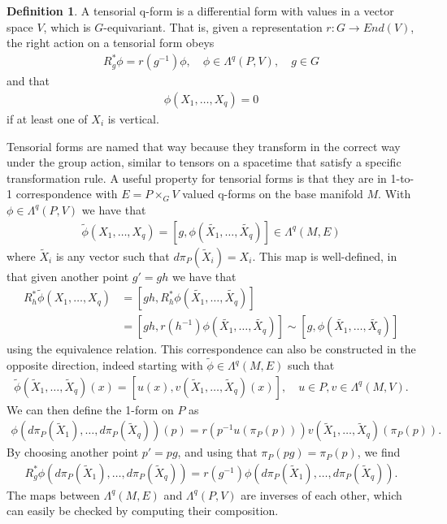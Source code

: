\documentclass[10pt]{report}
\theoremstyle{definition}
\newtheorem{definition}{Definition}[chapter]
\begin{document}
\begin{definition}
    A tensorial q-form is a differential form with values in a vector space $V$, which is $G$-equivariant. That is, given a representation $r : G \rightarrow End(V)$, the right action on a tensorial form obeys
    \begin{align}
        R_g^* \phi = r\left(g^{-1}\right) \phi,\quad \phi \in \Lambda^q(P,V), \quad g \in G
    \end{align}
    and that 
    \begin{align}
        \phi(X_1,\ldots,X_q) = 0
    \end{align}
    if at least one of $X_i$ is vertical.
\end{definition}
Tensorial forms are named that way because they transform in the correct way under the group action, similar to tensors on a spacetime that satisfy a specific transformation rule. A useful property for tensorial forms is that they are in 1-to-1 correspondence with $E = P \times_G V$ valued q-forms on the base manifold $M$. With $\phi \in \Lambda^q(P,V)$ we have that 
\begin{align}
    \tilde{\phi}(X_1,\ldots,X_q) = [g,\phi(\tilde{X_1},\ldots,\tilde{X_q})] \in \Lambda^q(M,E)
\end{align}
where $\tilde{X}_i$ is any vector such that $d\pi_P(\tilde{X}_i) = X_i$. This map is well-defined, in that given another point $g' = g h$ we have that 
\begin{align}
    R^*_h \tilde{\phi}(X_1,\ldots,X_q) &= [g h, R^*_h \phi(\tilde{X_1},\ldots,\tilde{X_q})] \\ &= [g h, r(h^{-1}) \phi(\tilde{X_1},\ldots,\tilde{X_q})] \sim [g,\phi(\tilde{X_1},\ldots,\tilde{X_q})]
\end{align}
using the equivalence relation. This correspondence can also be constructed in the opposite direction, indeed starting with $\tilde{\phi} \in \Lambda^q(M,E)$ such that
\begin{align}
    \tilde{\phi}(\tilde{X}_1,\ldots,\tilde{X}_q)(x) = [u(x),v(\tilde{X}_1,\ldots,\tilde{X}_q)(x)], \quad u \in P, v \in \Lambda^q(M,V).
\end{align}
We can then define the 1-form on $P$ as 
\begin{align}
    \phi(d\pi_P(\tilde{X}_1),\ldots,d\pi_P(\tilde{X}_q))(p) = r(p^{-1} u(\pi_P(p))) v(\tilde{X}_1,\ldots,\tilde{X}_q)(\pi_P(p)).
\end{align}
By choosing another point $p' = pg$, and using that $\pi_P(pg)=\pi_P(p)$, we find 
\begin{align}
    R_g^* \phi(d\pi_P(\tilde{X}_1),\ldots,d\pi_P(\tilde{X}_q)) = r(g^{-1}) \phi(d\pi_P(\tilde{X}_1),\ldots,d\pi_P(\tilde{X}_q)).
\end{align}
The maps between $\Lambda^q(M,E)$ and $\Lambda^q(P,V)$ are inverses of each other, which can easily be checked by computing their composition.
\end{document}
